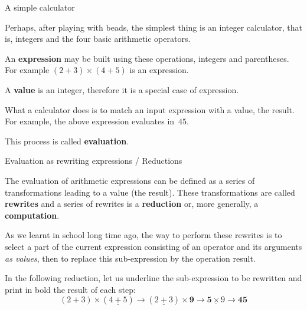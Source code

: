 %
\begin{frame}{A simple calculator}

  Perhaps, after playing with beads, the simplest thing is an integer
  calculator, that is, integers and the four basic arithmetic
  operators.

  \bigskip

  An \textbf{expression} may be built using these operations, integers
  and parentheses. For example \((2+3)\times(4+5)\) is an expression.

  \bigskip

  A \textbf{value}  is an integer, therefore  it is a special  case of
  expression.

  \bigskip

  What a calculator does is to match an input expression with a value,
  the result. For example, the above expression evaluates in~\(45\).

  \bigskip

  This process is called \textbf{evaluation}.

\end{frame}

%
\begin{frame}{Evaluation as rewriting expressions / Reductions}

  The evaluation of arithmetic expressions can be defined as a series
  of transformations leading to a value (the result). These
  transformations are called \textbf{rewrites} and a series of
  rewrites is a \textbf{reduction} or, more generally, a
  \textbf{computation}.

  \bigskip

  As we learnt in school long time ago, the way to perform these
  rewrites is to select a part of the current expression consisting of
  an operator and its arguments \emph{as values}, then to replace this
  sub-expression by the operation result.

  \bigskip

  In the following reduction, let us underline the sub-expression to
  be rewritten and print in bold the result of each step:
  \begin{equation*}
    (2+3) \times (\underline{4+5}) \rightarrow (\underline{2+3})
    \times \textbf{9} \rightarrow \underline{\textbf{5} \times 9}
    \rightarrow \textbf{45}
  \end{equation*}

\end{frame}

